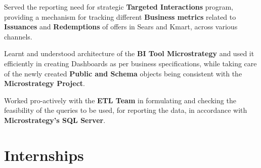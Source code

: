 \documentclass[a4paper]{norm-resume}
\begin{document}
\begin{tightitemize}
\small
{
\item Served the reporting need for strategic \textbf{Targeted Interactions} program, providing a mechanism for tracking different \textbf{Business metrics} related to \textbf{Issuances} and \textbf{Redemptions} of offers in Sears and Kmart, across various channels.
\item Learnt and understood architecture of the \textbf{BI Tool Microstrategy} and used it efficiently in creating Dashboards as per business specifications, while taking care of the newly created \textbf{Public and Schema} objects being consistent with the \textbf{Microstrategy Project}.  
\item Worked pro-actively with the \textbf{ETL Team} in formulating and checking the feasibility of the queries to be used, for reporting the data, in accordance with \textbf{Microstrategy's SQL Server}.
}
\end{tightitemize}

\section{Internships}

\vspace{0.75mm} %
		
				
 

\vspace{-3.5mm} %
\end{document}
